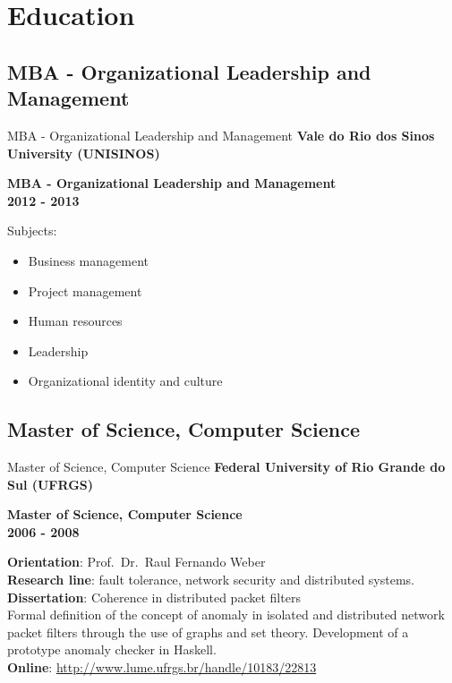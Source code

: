 \documentclass[ignorenonframetext]{beamer}
\providecommand{\tightlist}{\setlength{\itemsep}{0pt}\setlength{\parskip}{0pt}}
\newcommand{\myempha}[1]{{\color{dark27c1}\bf #1}}
\newcommand{\myemphb}[1]{{\color{dark27c2}\bf #1}}
\newcommand{\myemphc}[1]{{\color{dark27c3}\bf #1}}
\newcommand{\myemphg}[1]{{\color{dark27c7}\bf #1}}
\renewcommand{\emph}{\myemphg}
\begin{document}
\section{Education}



\subsection{MBA - Organizational Leadership and Management}
\begin{frame}{MBA - Organizational Leadership and Management}
    \myempha{Vale do Rio dos Sinos University (UNISINOS)}

    \myemphb{MBA - Organizational Leadership and Management} \\
    \hfill \myemphc{2012 - 2013}

    Subjects:
\begin{itemize}
\tightlist
\item
  Business management
\item
  Project management
\item
  Human resources
\item
  Leadership
\item
  Organizational identity and culture
\end{itemize}

\end{frame}



\subsection{Master of Science, Computer Science}
\begin{frame}{Master of Science, Computer Science}
    \myempha{Federal University of Rio Grande do Sul (UFRGS)}

    \myemphb{Master of Science, Computer Science} \\
    \hfill \myemphc{2006 - 2008}

    \emph{Orientation}: Prof.~Dr.~Raul Fernando Weber\\
\emph{Research line}: fault tolerance, network security and distributed
systems.\\
\emph{Dissertation}: Coherence in distributed packet filters\\
Formal definition of the concept of anomaly in isolated and distributed
network packet filters through the use of graphs and set theory.
Development of a prototype anomaly checker in Haskell.\\
\emph{Online}: \url{http://www.lume.ufrgs.br/handle/10183/22813}

\end{frame}
\end{document}
